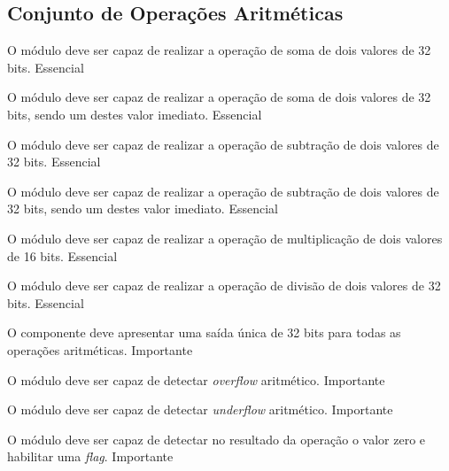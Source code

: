 \subsection{Conjunto de Operações Aritméticas} 
  
    \begin{functional}
      {O módulo deve ser capaz de realizar a operação de soma de dois valores de 32 bits.}
      {Essencial}
      
      {O módulo deve ser capaz de realizar a operação de soma de dois valores de 32 bits, sendo um destes valor imediato.}
      {Essencial}

      {O módulo deve ser capaz de realizar a operação de subtração de dois valores de 32 bits.}
      {Essencial}
      
      {O módulo deve ser capaz de realizar a operação de subtração de dois valores de 32 bits, sendo um destes valor imediato.}
      {Essencial}

      {O módulo deve ser capaz de realizar a operação de multiplicação de dois valores de 16 bits. }
      {Essencial}

      {O módulo deve ser capaz de realizar a operação de divisão de dois valores de 32 bits.}
      {Essencial} 
     

      {O componente deve apresentar uma saída única de 32 bits para todas as operações aritméticas.}
      {Importante}       

      {O módulo deve ser capaz de detectar \textit{overflow} aritmético.}
      {Importante}
      
      {O módulo deve ser capaz de detectar \textit{underflow} aritmético.}
      {Importante}
      
      {O módulo deve ser capaz de detectar no resultado da operação o valor zero e habilitar uma \textit{flag}.}
      {Importante}
      
    \end{functional}